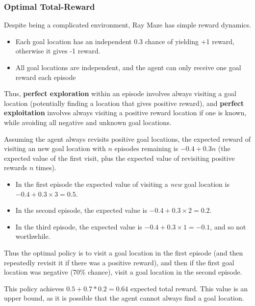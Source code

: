 \documentclass{article}
\begin{document}
\subsubsection{Optimal Total-Reward}

Despite being a complicated environment, Ray Maze has simple reward dynamics.

\begin{itemize}
    \item Each goal location has an independent 0.3 chance of yielding +1 reward, otherwise it gives -1 reward.
    \item All goal locations are independent, and the agent can only receive one goal reward each episode
\end{itemize}

Thus, \textbf{perfect exploration} within an episode involves always visiting a goal location (potentially finding a location that gives positive reward), and \textbf{perfect exploitation} involves always visiting a positive reward location if one is known, while avoiding all negative and unknown goal locations.

Assuming the agent always revisits positive goal locations, the expected reward of visiting an new goal location with \(n\) episodes remaining is \(-0.4 + 0.3n\) (the expected value of the first visit, plus the expected value of revisiting positive rewards \(n\) times).

\begin{itemize}
    \item In the first episode the expected value of visiting a \emph{new} goal location is \(-0.4 + 0.3 \times 3 = 0.5\).
    \item In the second episode, the expected value is \(-0.4 + 0.3 \times 2 = 0.2\).
    \item In the third episode, the expected value is \(-0.4 + 0.3 \times 1 = -0.1\), and so not worthwhile.
\end{itemize}

Thus the optimal policy is to visit a goal location in the first episode (and then repeatedly revisit it if there was a positive reward), and then if the first goal location was negative (70\% chance), visit a goal location in the second episode.

This policy achieves \(0.5 + 0.7 * 0.2 = 0.64\) expected total reward. This value is an upper bound, as it is possible that the agent cannot always find a goal location.

\vfill
\pagebreak
\end{document}
